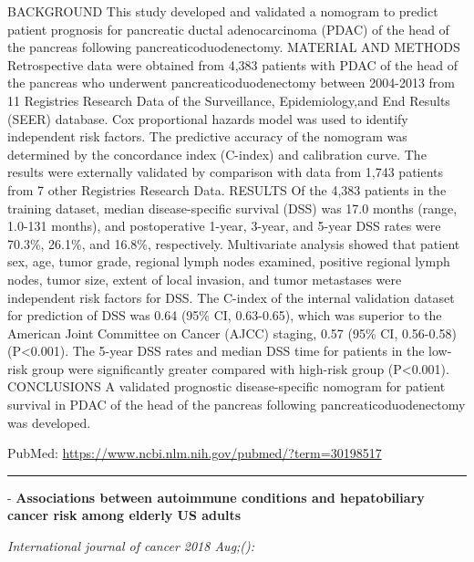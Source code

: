 \documentclass[]{article}
\begin{document}
BACKGROUND This study developed and validated a nomogram to predict
patient prognosis for pancreatic ductal adenocarcinoma (PDAC) of the
head of the pancreas following pancreaticoduodenectomy. MATERIAL AND
METHODS Retrospective data were obtained from 4,383 patients with PDAC
of the head of the pancreas who underwent pancreaticoduodenectomy
between 2004-2013 from 11 Registries Research Data of the Surveillance,
Epidemiology,and End Results (SEER) database. Cox proportional hazards
model was used to identify independent risk factors. The predictive
accuracy of the nomogram was determined by the concordance index
(C-index) and calibration curve. The results were externally validated
by comparison with data from 1,743 patients from 7 other Registries
Research Data. RESULTS Of the 4,383 patients in the training dataset,
median disease-specific survival (DSS) was 17.0 months (range, 1.0-131
months), and postoperative 1-year, 3-year, and 5-year DSS rates were
70.3\%, 26.1\%, and 16.8\%, respectively. Multivariate analysis showed
that patient sex, age, tumor grade, regional lymph nodes examined,
positive regional lymph nodes, tumor size, extent of local invasion, and
tumor metastases were independent risk factors for DSS. The C-index of
the internal validation dataset for prediction of DSS was 0.64 (95\% CI,
0.63-0.65), which was superior to the American Joint Committee on Cancer
(AJCC) staging, 0.57 (95\% CI, 0.56-0.58) (P\textless{}0.001). The
5-year DSS rates and median DSS time for patients in the low-risk group
were significantly greater compared with high-risk group
(P\textless{}0.001). CONCLUSIONS A validated prognostic disease-specific
nomogram for patient survival in PDAC of the head of the pancreas
following pancreaticoduodenectomy was developed.

PubMed: \url{https://www.ncbi.nlm.nih.gov/pubmed/?term=30198517}

{}

{}

\begin{center}\rule{0.5\linewidth}{\linethickness}\end{center}

 - \textbf{Associations between autoimmune conditions and hepatobiliary
cancer risk among elderly US adults}

\emph{International journal of cancer 2018 Aug;():}
\end{document}
